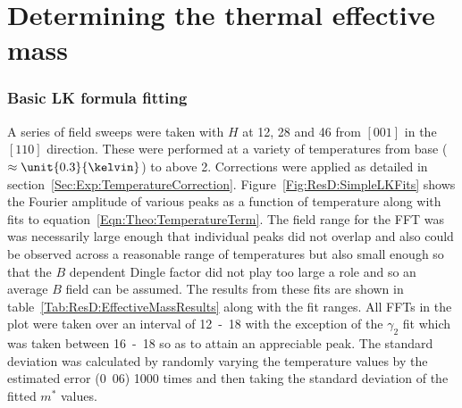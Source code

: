 
\section{Determining the thermal effective mass}


\subsubsection{Basic \ac{LK} formula fitting}

A series of field sweeps were taken with $H$ at \unit{12}{\degree}, \unit{28}{\degree} and \unit{46}{\degree} from $[001]$ in the $[110]$ direction. These were performed at a variety of temperatures from base ($\approx\unit{0.3}{\kelvin}$) to above \unit{2}{\kelvin}. Corrections were applied as detailed in section~\ref{Sec:Exp:TemperatureCorrection}. Figure~\ref{Fig:ResD:SimpleLKFits} shows the Fourier amplitude of various peaks as a function of temperature along with fits to equation~\ref{Eqn:Theo:TemperatureTerm}. The field range for the \ac{FFT} was was necessarily large enough that individual peaks did not overlap and also could be observed across a reasonable range of temperatures but also small enough so that the $B$ dependent Dingle factor did not play too large a role and so an average $B$ field can be assumed. The results from these fits are shown in table~\ref{Tab:ResD:EffectiveMassResults} along with the fit ranges. All \acp{FFT} in the plot were taken over an interval of \unit{12-18}{\tesla} with the exception of the $\gamma_2$ fit which was taken between \unit{16-18}{\tesla} so as to attain an appreciable peak. The standard deviation was calculated by randomly varying the temperature values by the estimated error (\unit{0.06}{\tesla}) 1000 times and then taking the standard deviation of the fitted $m^*$ values.
